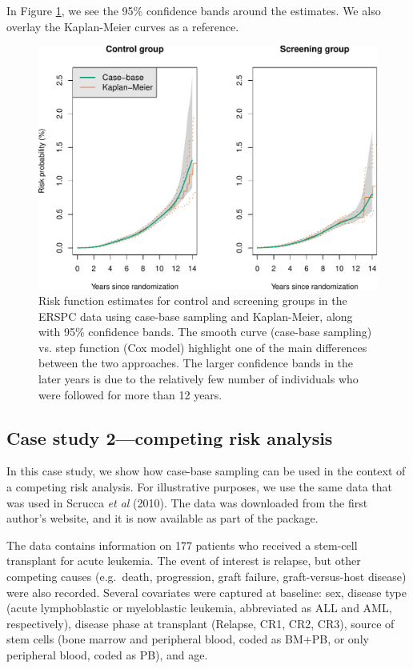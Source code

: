 In Figure \ref{fig:erspc-cif-conf}, we see the 95\% confidence bands around the estimates.
We also overlay the Kaplan-Meier curves as a reference.

\begin{figure}[ht]
\includegraphics[width=\textwidth,keepaspectratio=true]{./erspc-cif-conf-1} \caption{Risk function estimates for control and screening groups in the ERSPC data using case-base sampling and Kaplan-Meier, along with 95\% confidence bands. The smooth curve (case-base sampling) vs. step function (Cox model) highlight one of the main differences between the two approaches. The larger confidence bands in the later years is due to the relatively few number of individuals who were followed for more than 12 years.}\label{fig:erspc-cif-conf}
\end{figure}

\hypertarget{case-study-2competing-risk-analysis}{%
\subsection{Case study 2---competing risk analysis}\label{case-study-2competing-risk-analysis}}

In this case study, we show how case-base sampling can be used in the context of a competing risk analysis. For illustrative purposes, we use the same data that was used in Scrucca \emph{et al} (2010). The data was downloaded from the first author's website, and it is now available as part of the  package.

The data contains information on 177 patients who received a stem-cell transplant for acute leukemia. The event of interest is relapse, but other competing causes (e.g.~death, progression, graft failure, graft-versus-host disease) were also recorded. Several covariates were captured at baseline: sex, disease type (acute lymphoblastic or myeloblastic leukemia, abbreviated as ALL and AML, respectively), disease phase at transplant (Relapse, CR1, CR2, CR3), source of stem cells (bone marrow and peripheral blood, coded as BM+PB, or only peripheral blood, coded as PB), and age.

